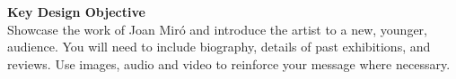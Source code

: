 





\textbf{Key Design Objective}\\


Showcase the work of Joan Mir\'{o} and introduce the artist to a new, younger, audience.  You will need to include biography, details of past exhibitions, and reviews.  Use images, audio and video to reinforce your message where necessary.\\




